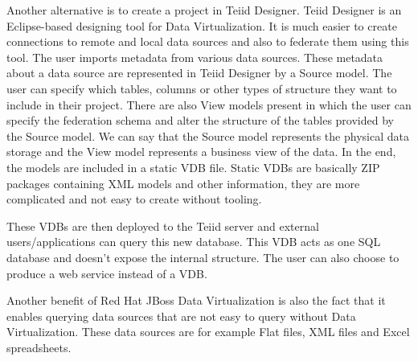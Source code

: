 \documentclass[12pt,oneside]{fithesis2}
\begin{document}
\par Another alternative is to create a project in Teiid Designer. Teiid Designer is an Eclipse-based designing tool for Data Virtualization. It is much easier to create connections to remote and local data sources and also to federate them using this tool. The user imports metadata from various data sources. These metadata about a data source are represented in Teiid Designer by a Source model. The user can specify which tables, columns or other types of structure they want to include in their project. There are also View models present in which the user can specify the federation schema and alter the structure of the tables provided by the Source model. We can say that the Source model represents the physical data storage and the View model represents a business view of the data. In the end, the models are included in a static VDB file. Static VDBs are basically ZIP packages containing XML models and other information, they are more complicated and not easy to create without tooling. 
\par These VDBs are then deployed to the Teiid server and external users/applications can query this new database. This VDB acts as one SQL database and doesn't expose the internal structure. The user can also choose to produce a web service instead of a VDB. 
\par Another benefit of Red Hat JBoss Data Virtualization is also the fact that it enables querying data sources that are not easy to query without Data Virtualization. These data sources are for example Flat files, XML files and Excel spreadsheets.
\end{document}
